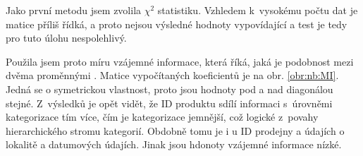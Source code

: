  
Jako první metodu jsem zvolila  $\chi^2$ statistiku. Vzhledem k~vysokému počtu dat je matice příliš řídká, a proto nejsou výsledné hodnoty vypovídající a test je tedy pro tuto úlohu nespolehlivý.

Použila jsem proto míru vzájemné informace, která říká, jaká je podobnost mezi dvěma proměnnými \cite{bib:scikit}.
Matice vypočítaných koeficientů je na obr. \ref*{obr:nb:MI}. Jedná se o symetrickou vlastnost, proto jsou hodnoty pod a nad diagonálou stejné. Z~výsledků je opět vidět, že ID produktu sdílí informaci s~úrovněmi kategorizace tím více, čím je kategorizace jemnější, což logické z~povahy hierarchického stromu kategorií. Obdobně tomu je i u ID prodejny a údajích o lokalitě a datumových údajích. Jinak jsou hdonoty vzájemné informace nízké.

